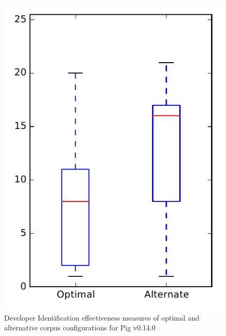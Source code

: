 
\begin{figure}
\centering
\includegraphics[height=0.4\textheight]{figures/combo/dit_rq2_pig}
\caption{Developer Identification effectiveness measures of optimal and alternative corpus configurations for Pig v0.14.0}
\label{fig:combo:dit:rq2:pig}
\end{figure}
